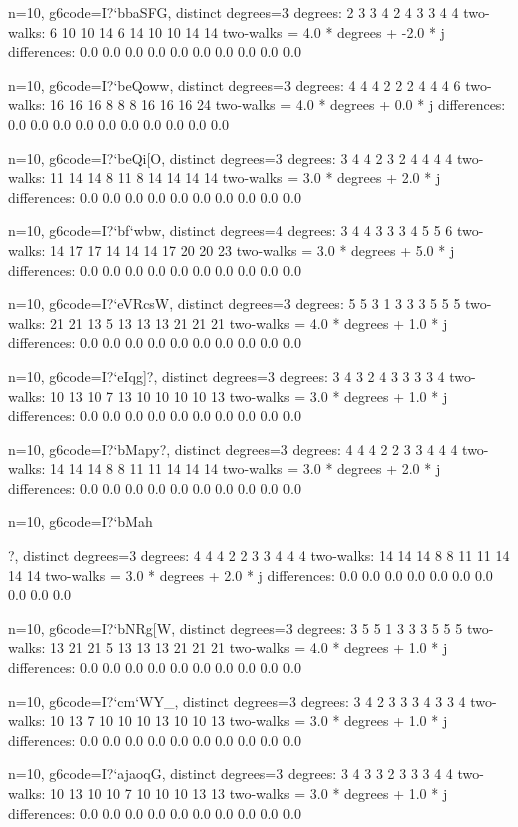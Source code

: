 {{{{{{{{{{{n=10, g6code=I?`bbaSFG, distinct degrees=3
degrees: 2 3 3 4 2 4 3 3 4 4 
two-walks: 6 10 10 14 6 14 10 10 14 14 
two-walks = 4.0 * degrees + -2.0 * j
differences: 0.0 0.0 0.0 0.0 0.0 0.0 0.0 0.0 0.0 0.0 

n=10, g6code=I?`beQoww, distinct degrees=3
degrees: 4 4 4 2 2 2 4 4 4 6 
two-walks: 16 16 16 8 8 8 16 16 16 24 
two-walks = 4.0 * degrees + 0.0 * j
differences: 0.0 0.0 0.0 0.0 0.0 0.0 0.0 0.0 0.0 0.0 

n=10, g6code=I?`beQi[O, distinct degrees=3
degrees: 3 4 4 2 3 2 4 4 4 4 
two-walks: 11 14 14 8 11 8 14 14 14 14 
two-walks = 3.0 * degrees + 2.0 * j
differences: 0.0 0.0 0.0 0.0 0.0 0.0 0.0 0.0 0.0 0.0 

n=10, g6code=I?`bf`wbw, distinct degrees=4
degrees: 3 4 4 3 3 3 4 5 5 6 
two-walks: 14 17 17 14 14 14 17 20 20 23 
two-walks = 3.0 * degrees + 5.0 * j
differences: 0.0 0.0 0.0 0.0 0.0 0.0 0.0 0.0 0.0 0.0 

n=10, g6code=I?`eVRcsW, distinct degrees=3
degrees: 5 5 3 1 3 3 3 5 5 5 
two-walks: 21 21 13 5 13 13 13 21 21 21 
two-walks = 4.0 * degrees + 1.0 * j
differences: 0.0 0.0 0.0 0.0 0.0 0.0 0.0 0.0 0.0 0.0 

n=10, g6code=I?`eIqg]?, distinct degrees=3
degrees: 3 4 3 2 4 3 3 3 3 4 
two-walks: 10 13 10 7 13 10 10 10 10 13 
two-walks = 3.0 * degrees + 1.0 * j
differences: 0.0 0.0 0.0 0.0 0.0 0.0 0.0 0.0 0.0 0.0 

n=10, g6code=I?`bMapy?, distinct degrees=3
degrees: 4 4 4 2 2 3 3 4 4 4 
two-walks: 14 14 14 8 8 11 11 14 14 14 
two-walks = 3.0 * degrees + 2.0 * j
differences: 0.0 0.0 0.0 0.0 0.0 0.0 0.0 0.0 0.0 0.0 

n=10, g6code=I?`bMah{?, distinct degrees=3
degrees: 4 4 4 2 2 3 3 4 4 4 
two-walks: 14 14 14 8 8 11 11 14 14 14 
two-walks = 3.0 * degrees + 2.0 * j
differences: 0.0 0.0 0.0 0.0 0.0 0.0 0.0 0.0 0.0 0.0 

n=10, g6code=I?`bNRg[W, distinct degrees=3
degrees: 3 5 5 1 3 3 3 5 5 5 
two-walks: 13 21 21 5 13 13 13 21 21 21 
two-walks = 4.0 * degrees + 1.0 * j
differences: 0.0 0.0 0.0 0.0 0.0 0.0 0.0 0.0 0.0 0.0 

n=10, g6code=I?`cm`WY_, distinct degrees=3
degrees: 3 4 2 3 3 3 4 3 3 4 
two-walks: 10 13 7 10 10 10 13 10 10 13 
two-walks = 3.0 * degrees + 1.0 * j
differences: 0.0 0.0 0.0 0.0 0.0 0.0 0.0 0.0 0.0 0.0 

n=10, g6code=I?`ajaoqG, distinct degrees=3
degrees: 3 4 3 3 2 3 3 3 4 4 
two-walks: 10 13 10 10 7 10 10 10 13 13 
two-walks = 3.0 * degrees + 1.0 * j
differences: 0.0 0.0 0.0 0.0 0.0 0.0 0.0 0.0 0.0 0.0 

}}}}}}}}}}}}
